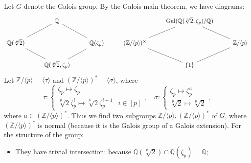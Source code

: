 \begin{solution}
    Let $G$ denote the Galois group. By the Galois main theorem, we have diagrams:
        \[
            \begin{tikzcd}
                & \mathbb{Q} \arrow[ld, no head] \arrow[rd, no head] &                                         &                             & {\operatorname{Gal}(\mathbb{Q}(\sqrt[p]{2}, \zeta_p)/\mathbb{Q})} \arrow[ld, no head] \arrow[rd, no head] &                         \\
            {\mathbb{Q}(\sqrt[p]2)} \arrow[rd, no head] &                                                    & \mathbb{Q}(\zeta_p) \arrow[ld, no head] & (\mathbb{Z}/\langle {p} \rangle)^{\times}  \arrow[rd, no head] &                                                                                                           & \mathbb{Z}/\langle p \rangle  \arrow[ld, no head] \\
                & {\mathbb{Q}(\sqrt[p]2,\zeta_p)}                    &                                         &                             & \{1\}                                                                                                     &                        
            \end{tikzcd}
        \]
    Let $\mathbb{Z}/\langle {p} \rangle = \langle \tau \rangle $ and $(\mathbb{Z}/\langle p\rangle)^\ast = \langle \sigma \rangle $, where 
        \[
            \tau \colon 
                \begin{cases} 
                \zeta_p \mapsto \zeta_p \\ 
                \sqrt[p]{2}\zeta_p^i \mapsto \sqrt[p]{2}\zeta_p^{i+1} & i\in[p] 
                \end{cases},\quad
            \sigma \colon 
                \begin{cases}
                    \zeta_{p}\mapsto\zeta^{a}_{p}\\
                    \sqrt[p]{2}\mapsto\sqrt[p]{2}
                \end{cases},
        \]
    where $a\in(\mathbb{Z}/\langle p\rangle)^\ast$. 
    Thus we find two subgroups $\mathbb{Z}/\langle p \rangle,(\mathbb{Z}/\langle p\rangle)^\ast  $ of $G$, where $(\mathbb{Z}/\langle p\rangle)^\ast$ is normal 
    (because it is the Galois group of a Galois extension). For the structure of the group: 
    \begin{itemize}
        \item They have trivial intersection: because $\mathbb{Q}(\sqrt[p]{2})\cap\mathbb{Q}(\zeta_{p})=\mathbb{Q}$;

\end{itemize}
\end{solution}
